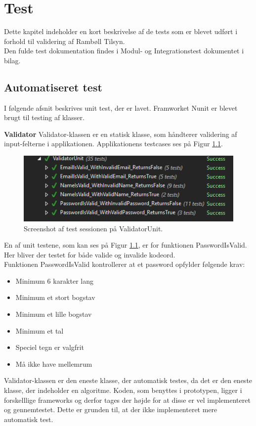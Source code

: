 \chapter{Test}
Dette kapitel indeholder en kort beskrivelse af de tests som er blevet udført i forhold til validering af Rambøll Tilsyn. \\
Den fulde test dokumentation findes i Modul- og Integrationstest dokumentet i bilag. \\

\section{Automatiseret test}
I følgende afsnit beskrives unit test, der er lavet. Framworket Nunit\cite{NUnit} er blevet brugt til testing af klasser. 

\textbf{Validator}
Validator-klassen er en statisk klasse, som håndterer validering af input-felterne i applikationen. Applikationens testcases ses på Figur \ref{fig:ValidatorUnit}.
\begin{figure}[H]
	\centering
	\includegraphics[width=0.6\linewidth]{Test/ValidatorUnit}
	\caption{Screenshot af test sessionen på ValidatorUnit.}
	\label{fig:ValidatorUnit}
\end{figure}

En af unit testene, som kan ses på Figur \ref{fig:ValidatorUnit}, er for funktionen PasswordIsValid. Her bliver der testet for både valide og invalide kodeord.\\
Funktionen PasswordIsValid kontrollerer at et password opfylder følgende krav:
\begin{itemize}
	\item Minimum 6 karakter lang
	\item Minimum et stort bogstav
	\item Minimum et lille bogstav
	\item Minimum et tal
	\item Speciel tegn er valgfrit
	\item Må ikke have mellemrum
\end{itemize}

Validator-klassen er den eneste klasse, der automatisk testes, da det er den eneste klasse, der indeholder en algoritme. Koden, som benyttes i prototypen, ligger i forskelllige frameworks og derfor tages der højde for at disse er vel implementeret og gennemtestet. Dette er grunden til, at der ikke implementeret mere automatisk test. 

